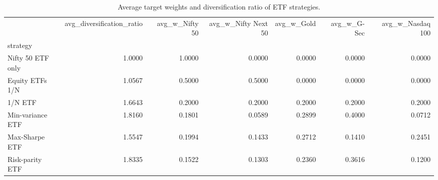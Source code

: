 \begin{table}
\caption{Average target weights and diversification ratio of ETF strategies.}
\label{tab:T06_weights_diversification}
\begin{tabular}{lrrrrrr}
\toprule
 & avg\_diversification\_ratio & avg\_w\_Nifty 50 & avg\_w\_Nifty Next 50 & avg\_w\_Gold & avg\_w\_G-Sec & avg\_w\_Nasdaq 100 \\
strategy &  &  &  &  &  &  \\
\midrule
Nifty 50 ETF only & 1.0000 & 1.0000 & 0.0000 & 0.0000 & 0.0000 & 0.0000 \\
Equity ETFs 1/N & 1.0567 & 0.5000 & 0.5000 & 0.0000 & 0.0000 & 0.0000 \\
1/N ETF & 1.6643 & 0.2000 & 0.2000 & 0.2000 & 0.2000 & 0.2000 \\
Min-variance ETF & 1.8160 & 0.1801 & 0.0589 & 0.2899 & 0.4000 & 0.0712 \\
Max-Sharpe ETF & 1.5547 & 0.1994 & 0.1433 & 0.2712 & 0.1410 & 0.2451 \\
Risk-parity ETF & 1.8335 & 0.1522 & 0.1303 & 0.2360 & 0.3616 & 0.1200 \\
\bottomrule
\end{tabular}
\end{table}
